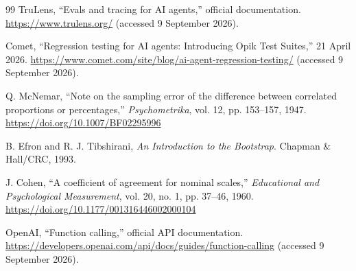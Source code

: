 \documentclass[preprint,12pt]{elsarticle}
\begin{document}
\begin{thebibliography}{99}
TruLens, ``Evals and tracing for AI agents,'' official documentation. \url{https://www.trulens.org/} (accessed 9 September 2026).

Comet, ``Regression testing for AI agents: Introducing Opik Test Suites,'' 21 April 2026. \url{https://www.comet.com/site/blog/ai-agent-regression-testing/} (accessed 9 September 2026).

Q. McNemar, ``Note on the sampling error of the difference between correlated proportions or percentages,'' \emph{Psychometrika}, vol. 12, pp. 153--157, 1947.
\url{https://doi.org/10.1007/BF02295996}

B. Efron and R. J. Tibshirani, \emph{An Introduction to the Bootstrap}. Chapman \& Hall/CRC, 1993.

J. Cohen, ``A coefficient of agreement for nominal scales,'' \emph{Educational and Psychological Measurement}, vol. 20, no. 1, pp. 37--46, 1960.
\url{https://doi.org/10.1177/001316446002000104}

OpenAI, ``Function calling,'' official API documentation. \url{https://developers.openai.com/api/docs/guides/function-calling} (accessed 9 September 2026).

\end{thebibliography}
\end{document}
